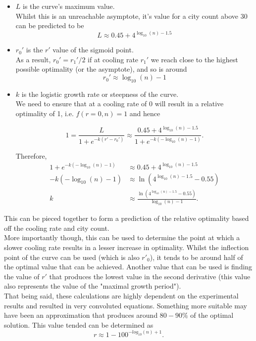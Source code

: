 \documentclass{article}
\begin{document}
\begin{itemize}
    \item $L$ is the curve's maximum value. \\
    Whilst this is an unreachable asymptote, it's value for a city count above 30 can be predicted to be
    $$L \approx 0.45 + 4^{\log_{10}(n) - 1.5}$$
    
    \item $r_0'$ is the $r'$ value of the sigmoid point. \\
    As a result, $r_0' = r_1' / 2$ if at cooling rate $r_1'$ we reach close to the highest possible optimality (or the asymptote), and so is around
    $$r_0' \approx \log_{10}(n) - 1$$
    
    \item $k$ is the logistic growth rate or steepness of the curve. \\
    We need to ensure that at a cooling rate of 0 will result in a relative optimality of 1, i.e. $f(r = 0, n) = 1$ and hence
    
    $$1 = \frac{L}{1 + e^{-k(r' - r_0')}} \approx \frac{0.45 + 4^{\log_{10}(n) - 1.5}}{1 + e^{-k(-\log_{10}(n) - 1)}}.$$
    
    Therefore, 
    \begin{align*}
        1 + e^{-k(-\log_{10}(n) - 1)}
            &\approx 0.45 + 4^{\log_{10}(n) - 1.5} \\
        -k(-\log_{10}(n) - 1)
            &\approx \ln(4^{\log_{10}(n) - 1.5} - 0.55) \\
        k
            &\approx \frac{\ln(4^{\log_{10}(n) - 1.5} - 0.55)}{\log_{10}(n) - 1}.
    \end{align*}
\end{itemize}

This can be pieced together to form a prediction of the relative optimality based off the cooling rate and city count.
\\

More importantly though, this can be used to determine the point at which a slower cooling rate results in a lesser increase in optimality. 
Whilst the inflection point of the curve can be used (which is also $r'_0$), it tends to be around half of the optimal value that can be achieved.
Another value that can be used is finding the value of $r'$ that produces the lowest value in the second derivative (this value also represents the value of the "maximal growth period").
\\

That being said, these calculations are highly dependent on the experimental results and resulted in very convoluted equations.
Something more suitable may have been an approximation that produces around $80 - 90\%$ of the optimal solution.
This value tended can be determined as
$$r \approx 1 - 100^{-log_{10}(n)+1}.$$
\end{document}

